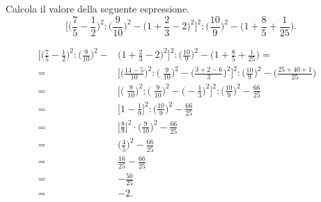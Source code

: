 \begin{esempio}
   Calcola il valore della seguente espressione.
\[\bigg[\bigg(\frac{7}{5}-\frac{1}{2}\bigg)^{2}:\bigg(\frac{9}{10}\bigg)^{2}-\bigg(1+\frac{2}{3}-2\bigg)^{2}\bigg]^{2}:\bigg(\frac{10}{9}\bigg)^{2}-\bigg(1+\frac{8}{5}+\frac{1}{25}\bigg).\]

 \begin{align*}
\bigg[\bigg(\frac{7}{5}-\frac{1}{2}\bigg)^{2}:\bigg(\frac{9}{10}\bigg)^{2}-&\bigg(1+\frac{2}{3}-2\bigg)^{2}\bigg]^{2}:%
\bigg(\frac{10}{9}\bigg)^{2}-\bigg(1+\frac{8}{5}+\frac{1}{25}\bigg)=\\
=&\bigg[\bigg(\frac{14-5}{10}\bigg)^{2}:\bigg(\;\frac{9}{10}\bigg)^{2}-\bigg(\frac{3+2-6}{3}\bigg)^{2}\bigg]^{2}:%
\bigg(\frac{10}{9}\bigg)^{2}-\bigg(\frac{25+40+1}{25}\bigg)\\
=&\bigg[\bigg(\;\frac{9}{10}\bigg)^{2}:\bigg(\;\frac{9}{10}\bigg)^{2}-\bigg(-{\frac{1}{3}}\bigg)^{2}\bigg]^{2}:\bigg(\frac{10}{9}\bigg)^{2}-\frac{66}{25}\\
=&\bigg[1-\frac{1}{9}\bigg]^{2}:\bigg(\frac{10}{9}\bigg)^{2}-\frac{66}{25}\\
=&\bigg[\frac{8}{9}\bigg]^{2}\cdot\bigg(\frac{9}{10}\bigg)^{2}-\frac{66}{25}\\
=&\bigg(\frac{4}{5}\bigg)^{2}-\frac{66}{25}\\
=&\frac{16}{25}-\frac{66}{25}\\
=&-{\frac{50}{25}}&\\
=&-2.
\end{align*}
\end{esempio}

\vspazio\ovalbox{\risolvii \ref{ese:3.131}, \ref{ese:3.132}, \ref{ese:3.133}, \ref{ese:3.134}, \ref{ese:3.135}, \ref{ese:3.136}, \ref{ese:3.137}, \ref{ese:3.138}, \ref{ese:3.139}, \ref{ese:3.140}}

\newpage

\cleardoublepage
